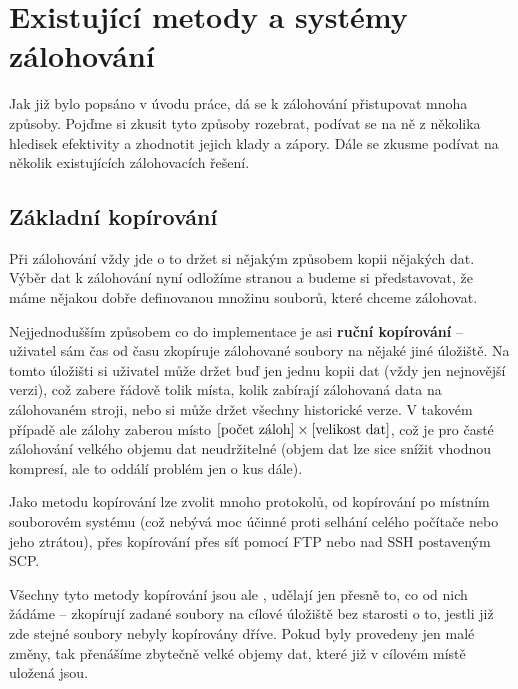 \chapter{Existující metody a systémy zálohování}

Jak již bylo popsáno v úvodu práce, dá se k zálohování přistupovat mnoha způsoby.
Pojďme si zkusit tyto způsoby rozebrat, podívat se na ně z několika hledisek
efektivity a zhodnotit jejich klady a zápory. Dále se zkusme podívat na
několik existujících zálohovacích řešení.

\section{Základní kopírování}

Při zálohování vždy jde o to držet si nějakým způsobem kopii nějakých dat. Výběr
dat k zálohování nyní odložíme stranou a budeme si představovat, že máme nějakou
dobře definovanou množinu souborů, které chceme zálohovat.


Nejjednodušším způsobem co do implementace je asi {\bf ruční kopírování} --
uživatel sám čas od času zkopíruje zálohované soubory na nějaké jiné úložiště.
Na tomto úložišti si uživatel může držet buď jen jednu kopii dat (vždy jen
nejnovější verzi), což zabere řádově tolik místa, kolik zabírají zálohovaná data
na zálohovaném stroji, nebo si může držet všechny historické verze. V takovém
případě ale zálohy zaberou místo $[\hbox{počet záloh}]\times[\hbox{velikost dat}]$,
což je pro časté zálohování velkého objemu dat neudržitelné (objem dat lze sice
snížit vhodnou kompresí, ale to oddálí problém jen o kus dále).

Jako metodu kopírování lze zvolit mnoho protokolů, od kopírování po místním
souborovém systému (což nebývá moc účinné proti selhání celého počítače nebo
jeho ztrátou), přes kopírování přes síť pomocí \gls{FTP} nebo nad \gls{SSH}
postaveným \gls{SCP}.

Všechny tyto metody kopírování jsou ale , udělají jen přesně to, co
od nich žádáme -- zkopírují zadané soubory na cílové úložiště bez starosti o to,
jestli již zde stejné soubory nebyly kopírovány dříve. Pokud byly provedeny jen
malé změny, tak přenášíme zbytečně velké objemy dat, které již v cílovém místě
uložená jsou.

